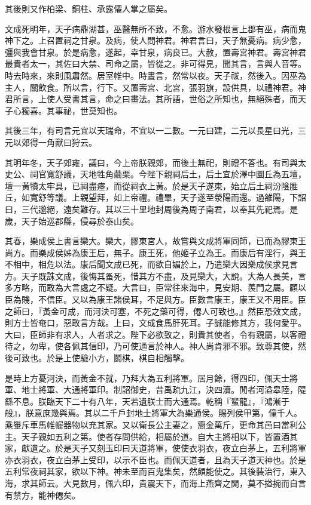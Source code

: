 其後則又作柏梁、銅柱、承露僊人掌之屬矣。

文成死明年，天子病鼎湖甚，巫醫無所不致，不愈。游水發根言上郡有巫，病而鬼神下之。上召置祠之甘泉。及病，使人問神君。神君言曰，天子無憂病。病少愈，彊與我會甘泉。於是病愈，遂起，幸甘泉，病良已。大赦，置壽宮神君。壽宮神君最貴者太一，其佐曰大禁、司命之屬，皆從之。非可得見，聞其言，言與人音等。時去時來，來則風肅然。居室帷中。時晝言，然常以夜。天子祓，然後入。因巫為主人，關飲食。所以言，行下。又置壽宮、北宮，張羽旗，設供具，以禮神君。神君所言，上使人受書其言，命之曰畫法。其所語，世俗之所知也，無絕殊者，而天子心獨喜。其事祕，世莫知也。

其後三年，有司言元宜以天瑞命，不宜以一二數。一元曰建，二元以長星曰光，三元以郊得一角獸曰狩云。

其明年冬，天子郊雍，議曰，今上帝朕親郊，而後土無祀，則禮不答也。有司與太史公、祠官寬舒議，天地牲角繭栗。今陛下親祠后土，后土宜於澤中圜丘為五壇，壇一黃犢太牢具，已祠盡瘞，而從祠衣上黃。於是天子遂東，始立后土祠汾陰脽丘，如寬舒等議。上親望拜，如上帝禮。禮畢，天子遂至滎陽而還。過雒陽，下詔曰，三代邈絕，遠矣難存。其以三十里地封周後為周子南君，以奉其先祀焉。是歲，天子始巡郡縣，侵尋於泰山矣。

其春，樂成侯上書言欒大。欒大，膠東宮人，故嘗與文成將軍同師，已而為膠東王尚方。而樂成侯姊為康王后，無子。康王死，他姬子立為王。而康后有淫行，與王不相中，相危以法。康后聞文成已死，而欲自媚於上，乃遣欒大因樂成侯求見言方。天子既誅文成，後悔其蚤死，惜其方不盡，及見欒大，大說。大為人長美，言多方略，而敢為大言處之不疑。大言曰，臣常往來海中，見安期、羨門之屬。顧以臣為賤，不信臣。又以為康王諸侯耳，不足與方。臣數言康王，康王又不用臣。臣之師曰，『黃金可成，而河決可塞，不死之藥可得，僊人可致也。』然臣恐效文成，則方士皆奄口，惡敢言方哉。上曰，文成食馬肝死耳。子誠能修其方，我何愛乎。大曰，臣師非有求人，人者求之。陛下必欲致之，則貴其使者，令有親屬，以客禮待之，勿卑，使各佩其信印，乃可使通言於神人。神人尚肯邪不邪。致尊其使，然後可致也。於是上使驗小方，鬬棋，棋自相觸擊。

是時上方憂河決，而黃金不就，乃拜大為五利將軍。居月餘，得四印，佩天士將軍、地士將軍、大通將軍印。制詔御史，昔禹疏九江，決四瀆。閒者河溢皋陸，隄繇不息。朕臨天下二十有八年，天若遺朕士而大通焉。乾稱『蜚龍』，『鴻漸于般』，朕意庶幾與焉。其以二千戶封地士將軍大為樂通侯。賜列侯甲第，僮千人。乘轝斥車馬帷幄器物以充其家。又以衛長公主妻之，齎金萬斤，更命其邑曰當利公主。天子親如五利之第。使者存問供給，相屬於道。自大主將相以下，皆置酒其家，獻遺之。於是天子又刻玉印曰天道將軍，使使衣羽衣，夜立白茅上，五利將軍亦衣羽衣，夜立白茅上受印，以示不臣也。而佩天道者，且為天子道天神也。於是五利常夜祠其家，欲以下神。神未至而百鬼集矣，然頗能使之。其後裝治行，東入海，求其師云。大見數月，佩六印，貴震天下，而海上燕齊之閒，莫不搤捥而自言有禁方，能神僊矣。

